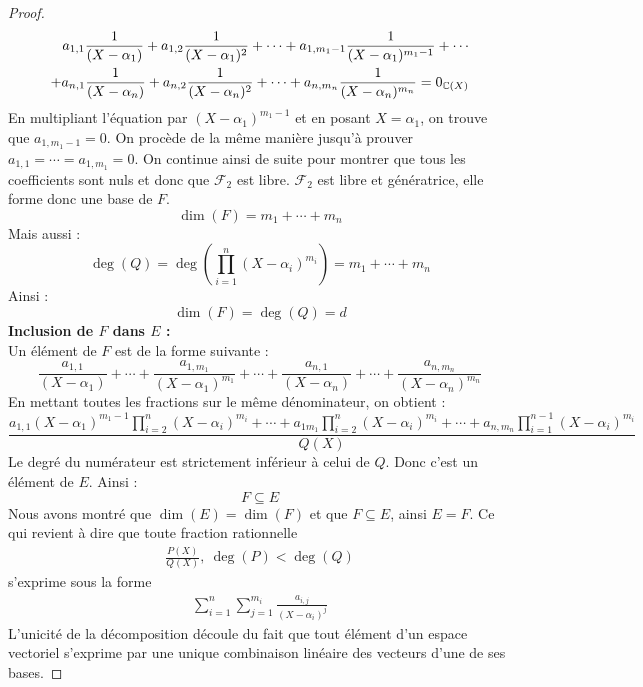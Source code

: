 \begin{proof}
\begin{align*}
\begin{split}
            a_{1,1} \frac{1}{(X - \alpha_1)} + a_{1,2} \frac{1}{(X - \alpha_1)^2} + \cdots + a_{1,m_1 - 1} \frac{1}{(X - \alpha_1)^{m_1 - 1}} + \cdots \\
            + a_{n,1} \frac{1}{(X - \alpha_n)} + a_{n,2} \frac{1}{(X - \alpha_n)^2} + \cdots + a_{n,m_n} \frac{1}{(X - \alpha_n)^{m_n}} = 0_{\mathbb{C}(X)}
        \end{split}
    \end{align*}
    En multipliant l'équation par $(X - \alpha_1)^{m_1 - 1}$ et en posant $X = \alpha_1$, on trouve que $a_{1,m_1 - 1} = 0$. On procède de la même manière jusqu'à prouver $a_{1,1} = \cdots = a_{1,m_1} = 0$.
    On continue ainsi de suite pour montrer que tous les coefficients sont nuls et donc que $\mathcal{F}_2$ est libre. $\mathcal{F}_2$ est libre et génératrice, elle forme donc une base de $F$.
    \[ \dim(F) = m_1 + \cdots + m_n \]
    Mais aussi : 
    \[ \deg(Q) = \deg \left( \prod_{i=1}^{n} (X - \alpha_i)^{m_i} \right) = m_1 + \cdots + m_n \]
    Ainsi : \[ \dim(F) = \deg(Q) = d \]
    \textbf{Inclusion de $F$ dans $E$ :}
    \\
    Un élément de $F$ est de la forme suivante : 
    \[ \frac{a_{1,1}}{(X - \alpha_1)} + \cdots + \frac{a_{1,m_1}}{(X - \alpha_1)^{m_1}} + \cdots + \frac{a_{n,1}}{(X - \alpha_n)} + \cdots + \frac{a_{n,m_n}}{(X - \alpha_n)^{m_n}} \]
    En mettant toutes les fractions sur le même dénominateur, on obtient :
    \[ \frac{a_{1,1}(X - \alpha_1)^{m_1 - 1} \prod_{i = 2}^{n}(X - \alpha_i)^{m_i} + \cdots + a_{1m_1} \prod_{i = 2}^{n}(X - \alpha_i)^{m_i} + \cdots + a_{n,m_n} \prod_{i = 1}^{n - 1}(X - \alpha_i)^{m_i}}{Q(X)} \]
    Le degré du numérateur est strictement inférieur à celui de $Q$. Donc c'est un élément de $E$. Ainsi :
    \[ F \subseteq E \]
    Nous avons montré que $\dim(E) = \dim(F)$ et que $F \subseteq E$, ainsi $E = F$.
    Ce qui revient à dire que toute fraction rationnelle 
    \begin{align*}
        \frac{P(X)}{Q(X)},\ \deg(P) < \deg(Q)
    \end{align*}
    s'exprime sous la forme 
    \begin{align*}
        \sum_{i=1}^n \sum_{j = 1}^{m_i} \frac{a_{i,j}}{(X - \alpha_i)^j}
    \end{align*}
    L'unicité de la décomposition découle du fait que tout élément d'un espace vectoriel s'exprime par une unique combinaison linéaire des vecteurs d'une de ses bases.
\end{proof}

